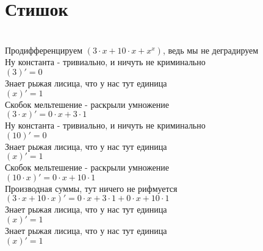 \documentclass[a4paper,12pt]{article}
\begin{document}
\section*{Стишок}\\
Продифференцируем $(3 \cdot x + 10 \cdot x + x ^{x} )$, ведь мы не деградируем\\
Ну константа - тривиально, и ничуть не криминально\\
\begin{math}
	(3)' = 0
\end{math}\\
Знает рыжая лисица, что у нас тут единица\\
\begin{math}
	(x)' = 1
\end{math}\\
Скобок мельтешение - раскрыли умножение\\
\begin{math}
	(3 \cdot x)' = 0 \cdot x + 3 \cdot 1
\end{math}\\
Ну константа - тривиально, и ничуть не криминально\\
\begin{math}
	(10)' = 0
\end{math}\\
Знает рыжая лисица, что у нас тут единица\\
\begin{math}
	(x)' = 1
\end{math}\\
Скобок мельтешение - раскрыли умножение\\
\begin{math}
	(10 \cdot x)' = 0 \cdot x + 10 \cdot 1
\end{math}\\
Производная суммы, тут ничего не рифмуется\\
\begin{math}
	(3 \cdot x + 10 \cdot x)' = 0 \cdot x + 3 \cdot 1 + 0 \cdot x + 10 \cdot 1
\end{math}\\
Знает рыжая лисица, что у нас тут единица\\
\begin{math}
	(x)' = 1
\end{math}\\
Знает рыжая лисица, что у нас тут единица\\
\begin{math}
	(x)' = 1
\end{math}\\
\end{document}
